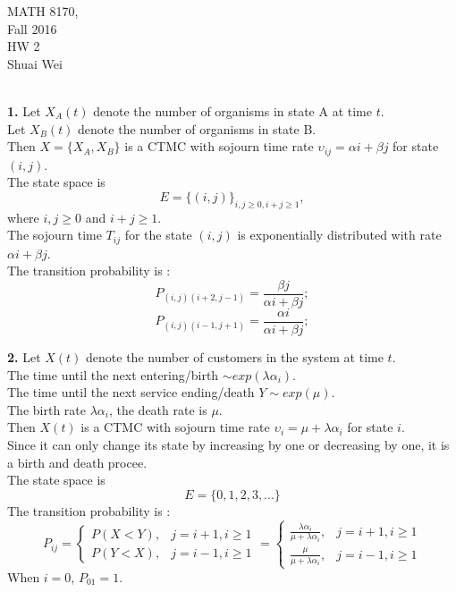 \documentclass{amsart}
\theoremstyle{plain}
\theoremstyle{definition}
\begin{document}
\noindent MATH 8170,  \\
Fall 2016\\
HW 2\\
Shuai Wei \\
\
\textwidth 6.0in \oddsidemargin 0.0in

\noindent \textbf{1.} 
Let $X_A(t)$ denote the number of organisms in state A at time $t$.\\
Let $X_B(t)$ denote the number of organisms in state B.\\
Then $X = \{X_A, X_B\}$ is a CTMC with sojourn time rate $\upsilon_{ij} = \alpha i + \beta j$ for state $(i,j)$. \\
The state space is 
\[E = \{(i,j)\}_{i,j\geq 0,i +j \geq 1} ,\]
where $i,j \geq 0$ and $i+j \geq 1 $.\\
The sojourn time $T_{ij}$ for the state $(i,j)$ is exponentially distributed with rate $\alpha i + \beta j$.\\
The transition probability is :
\[ P_{(i,j)(i+2,j-1)} = \frac{\beta j}{\alpha i + \beta j}; \]
\[ P_{(i,j)(i-1,j+1)} = \frac{\alpha i}{\alpha i + \beta j}; \]

\vspace{3mm}

\noindent \textbf{2.}
Let $X(t)$ denote the number of customers in the system at time $t$. \\
The time until the next entering/birth $\sim exp(\lambda \alpha_i)$.\\
The time until the next service ending/death $Y \sim exp(\mu)$.\\
The birth rate $\lambda \alpha_i $, the death rate is $\mu$.\\
Then $X(t)$ is a CTMC with sojourn time rate $\upsilon_i = \mu+ \lambda \alpha_i$ for state $i$.\\
Since it can only change its state by increasing by one or decreasing by one, it is a birth and death procee.\\
The state space is
\[ E= \{0,1,2,3,...\}\]
The transition probability is :
\[ 
  	P_{ij}  =  \left\{ 
					\begin{array}{ll}
  					  P(X<Y), & j = i+1, i\geq 1 \\ 
					  P(Y<X),& j = i-1, i\geq 1  
					\end{array}
			 	  \right. 
  	           =  \left\{ 
					\begin{array}{ll}
  					  \frac{\lambda \alpha_i}{\mu + \lambda \alpha_i}, & j = i+1, i\geq 1 \\ 
					  \frac{\mu}{\mu+\lambda\alpha_i},& j = i-1, i\geq 1  
					\end{array}
			 	  \right. 
\]
When $i = 0$, $P_{01} = 1$.
\end{document}

